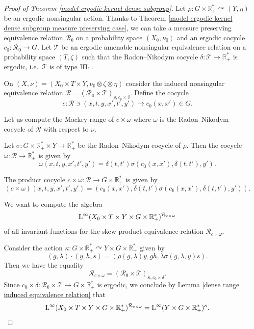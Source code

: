 \documentclass[a4paper,11pt]{amsart}
\numberwithin{equation}{section}
\theoremstyle{definition}
\newcommand{\R}{\mathbb{R}}
\newcommand{\cT}{\mathcal{T}}
\newcommand{\rL}{\mathord{\text{\rm L}}}
\newcommand{\cR}{\mathcal{R}}
\newcommand{\III}{{\rm III}}
\begin{document}
\begin{proof}[Proof of Theorem \ref{model ergodic kernel dense subgroup}]
    Let $\rho : G \times \R^*_+ \curvearrowright (Y,\eta)$ be an ergodic nonsingular action. Thanks to Theorem \ref{model ergodic kernel dense subgroup measure preserving case}, we can take a measure preserving equivalence relation $\cR_0$ on a probability space $(X_0,\nu_0)$ and an ergodic cocycle $c_0 : \cR_0 \rightarrow G$. Let $\cT$ be an ergodic amenable nonsingular equivalence relation on a probability space $(T,\zeta)$ such that the Radon--Nikodym cocycle $\delta : \cT \rightarrow \R^*_+$ is ergodic, i.e.\ $\cT$ is of type $\III_1$. 
    
    On $(X,\nu)=(X_0 \times T \times Y, \nu_0 \otimes \zeta \otimes \eta)$ consider the induced nonsingular equivalence relation $\cR=(\cR_0 \times \cT)_{\rho,c_0 \times \delta}$. Define the cocycle 
    $$c : \cR \ni (x,t,y,x',t',y') \mapsto c_0(x,x') \in G.$$

    Let us compute the Mackey range of $c \times \omega$ where $\omega$ is the Radon--Nikodym cocycle of $\cR$ with respect to $\nu$.
    
     Let $\sigma : G \times \R^*_+ \times Y \rightarrow \R^*_+$ be the Radon--Nikodym cocycle of $\rho$. Then the cocycle $\omega : \cR \rightarrow \R^*_+$ is given by  $$ \omega(x,t,y,x',t',y') = \delta(t,t') \sigma(c_0(x,x'),\delta(t,t'),y').$$
     

    The product cocycle $c \times \omega : \cR \rightarrow G \times \R^*_+$ is given by
    $$ (c \times \omega)(x,t,y,x',t',y') =\left( c_0(x,x'), \delta(t,t') \sigma(c_0(x,x'),\delta(t,t'),y') \right).$$

     
     
    We want to compute the algebra $$\rL^\infty(X_0 \times T \times Y \times G \times \R^*_+)^{\cR_{c \times \omega}}$$ of all invariant functions for the skew product equivalence relation $\cR_{c \times \omega}$. 
    
    Consider the action $\kappa :  G \times \R^*_+ \curvearrowright Y \times G \times \R^*_+$ given by $$(g,\lambda) \cdot (y,h,s) = (\rho(g,\lambda) y, g h, \lambda \sigma(g,\lambda,y) s).$$
    Then we have the equality $$\cR_{c \times \omega} = (\cR_0 \times \cT)_{\kappa,c_0 \times \delta}.$$ 
    Since $c_0 \times \delta : \cR_0 \times \cT \rightarrow G \times \R^*_+$ is ergodic, we conclude by Lemma \ref{dense range induced equivalence relation} that $$\rL^\infty(X_0 \times T \times Y \times G \times \R^*_+)^{\cR_{c \times \omega}}=\rL^\infty(Y \times G \times \R^*_+)^{\kappa}.$$


\end{proof}
\end{document}

